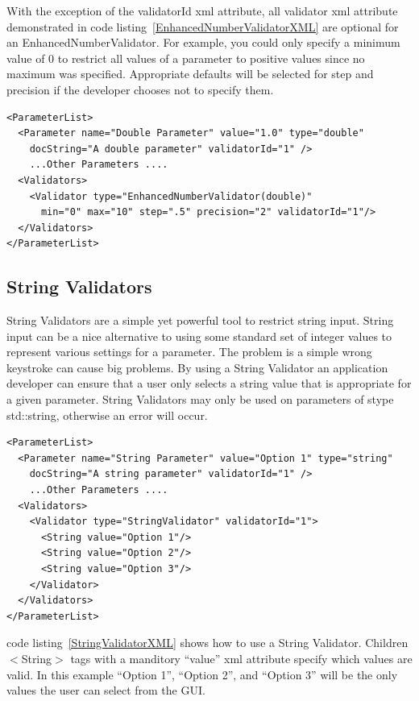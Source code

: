 With the exception of the validatorId xml attribute, all validator xml attribute demonstrated in code listing~\ref{EnhancedNumberValidatorXML}
are optional for an EnhancedNumberValidator. For example, you could only specify a minimum value of 0 to restrict all 
values of a parameter to positive values since no maximum was specified.
Appropriate defaults will be selected for step and precision if the developer chooses not to specify them.
\begin{lstlisting}[caption={Example usage of an Enhanced Number Validator}, label=EnhancedNumberValidatorXML]
<ParameterList>
  <Parameter name="Double Parameter" value="1.0" type="double" 
    docString="A double parameter" validatorId="1" />
    ...Other Parameters ....
  <Validators>
    <Validator type="EnhancedNumberValidator(double)" 
      min="0" max="10" step=".5" precision="2" validatorId="1"/>
  </Validators>
</ParameterList>
\end{lstlisting}

\subsection{String Validators}
String Validators are a simple yet powerful tool to restrict string input. String input can be a nice alternative to
using some standard set of integer values to represent various settings for a parameter. The problem is a simple wrong 
keystroke can cause big problems. By using a String Validator an application developer can ensure that a user 
only selects a string value that is appropriate for a given parameter. 
String Validators may only be used on parameters of stype std::string, otherwise an error will occur.
\begin{lstlisting}[caption={Example usage of a String Validator}, label=StringValidatorXML]
<ParameterList>
  <Parameter name="String Parameter" value="Option 1" type="string" 
    docString="A string parameter" validatorId="1" />
    ...Other Parameters ....
  <Validators>
    <Validator type="StringValidator" validatorId="1">
      <String value="Option 1"/> 
      <String value="Option 2"/> 
      <String value="Option 3"/> 
    </Validator>
  </Validators>
</ParameterList>
\end{lstlisting}
code listing~\ref{StringValidatorXML} shows how to use a String Validator. Children $<$String$>$ tags with a manditory ``value'' xml attribute specify which values are valid.
In this example ``Option 1'', ``Option 2'', and ``Option 3'' will be the only values the user can select from the GUI.

